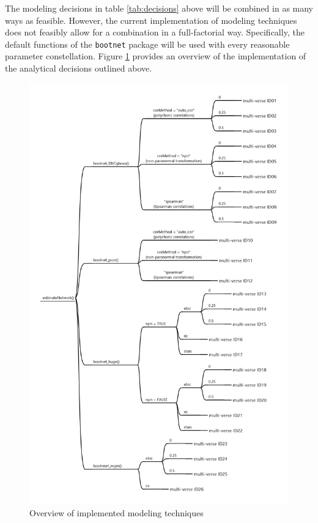 \documentclass[a4paper,12pt]{article} %
\begin{document}
		The modeling decisions in table \ref{tab:decisions} above will be combined in as many ways as feasible.
		However, the current implementation of modeling techniques does not feasibly allow for a combination in a full-factorial way.
		Specifically, the default functions of the \texttt{bootnet} package  \parencite{epskamp_estimating_2018} will be used with every reasonable parameter constellation.
		Figure \ref{fig:multiverse} provides an overview of the implementation of the analytical decisions outlined above. 

	\begin{figure}[H]
		\caption{\label{fig:multiverse}\protect\linebreak[1] 
			Overview of implemented modeling techniques}
		\centering
		\includegraphics[width=\linewidth]{../figures/multiverse.png}
	\end{figure}
\end{document}
